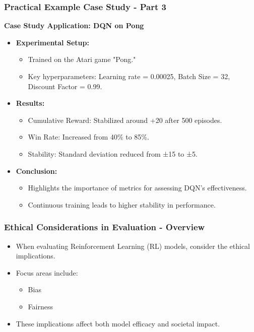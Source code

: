 \documentclass{beamer}
\begin{document}
\begin{frame}[fragile]
    \frametitle{Practical Example Case Study - Part 3}
    \textbf{Case Study Application: DQN on Pong}
    
    \begin{itemize}
        \item \textbf{Experimental Setup:}
        \begin{itemize}
            \item Trained on the Atari game "Pong."
            \item Key hyperparameters: Learning rate = 0.00025, Batch Size = 32, Discount Factor = 0.99.
        \end{itemize}

        \item \textbf{Results:}
        \begin{itemize}
            \item Cumulative Reward: Stabilized around +20 after 500 episodes.
            \item Win Rate: Increased from 40\% to 85\%.
            \item Stability: Standard deviation reduced from ±15 to ±5.
        \end{itemize}

        \item \textbf{Conclusion:}
        \begin{itemize}
            \item Highlights the importance of metrics for assessing DQN's effectiveness.
            \item Continuous training leads to higher stability in performance.
        \end{itemize}
    \end{itemize}
\end{frame}

\begin{frame}[fragile]
    \frametitle{Ethical Considerations in Evaluation - Overview}
    \begin{itemize}
        \item When evaluating Reinforcement Learning (RL) models, consider the ethical implications.
        \item Focus areas include:
        \begin{itemize}
            \item Bias
            \item Fairness
        \end{itemize}
        \item These implications affect both model efficacy and societal impact.
    \end{itemize}
\end{frame}
\end{document}
